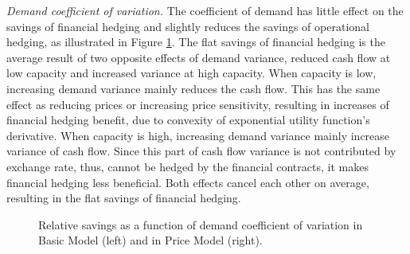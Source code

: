 \documentclass[mnsc,nonblindrev,copyedit]{informs2_wz} %
\begin{document}
{\noindent \em Demand coefficient of variation.} The coefficient of demand has little effect on the savings of financial hedging and slightly reduces the savings of operational hedging, as illustrated in Figure \ref{fig:demand}.  The flat savings of financial hedging is the average result of two opposite effects of demand variance, reduced cash flow at low capacity and increased variance at high capacity.  When capacity is low, increasing demand variance mainly reduces the cash flow.  This has the same effect as reducing prices or increasing price sensitivity, resulting in increases of financial hedging benefit, due to convexity of exponential utility function's derivative.  When capacity is high, increasing demand variance mainly increase variance of cash flow. Since this part of cash flow variance is not contributed by exchange rate, thus, cannot be hedged by the financial contracts, it makes financial hedging less beneficial.  Both effects cancel each other on average, resulting in the flat savings of financial hedging.  %
\begin{figure}[ht]
\begin{center}
\begin{minipage}{6in}
    \begin{minipage}{3.1in}
        \epsfxsize=2.8in
    \hspace{-0.0in}    
    \end{minipage}
    \begin{minipage}{2.8in}
        \epsfxsize=2.8in
    \hspace{-0.0in}    
    \end{minipage}
\end{minipage}
\vspace{.05in} \caption{Relative savings as a function of demand coefficient of variation in Basic Model (left) and in Price Model (right).} \label{fig:demand} \vspace{-.2in}
\end{center}
\end{figure}
\end{document}
